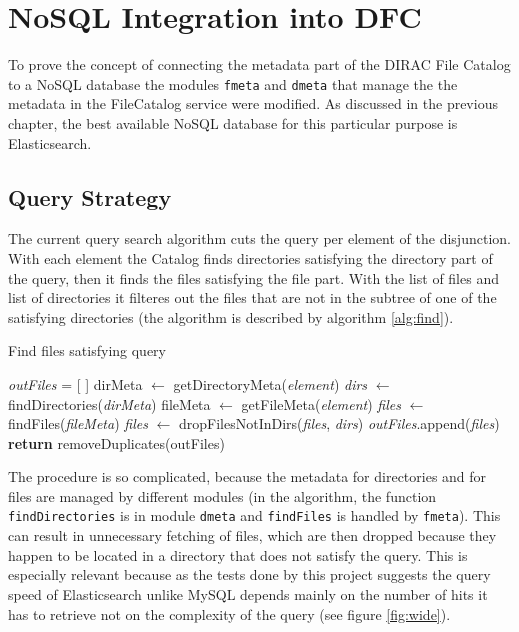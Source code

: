 \chapter{NoSQL Integration into DFC}
\label{chap:NoSQL}

To prove the concept of connecting the metadata part of the DIRAC File Catalog to a NoSQL database the 
modules \texttt{fmeta} and \texttt{dmeta} that manage the the metadata in the FileCatalog service were modified.
As discussed in the previous chapter, the best available NoSQL database for this particular purpose is 
Elasticsearch. 

\section{Query Strategy}
The current query search algorithm cuts the query per element of the disjunction. With each element the Catalog
finds directories satisfying the directory part of the query, then it finds the files satisfying the file part. 
With the list of files and list of directories it filteres out the files that are not in the subtree of one of the
satisfying directories (the algorithm is described by algorithm \ref{alg:find}).

\begin{algorithm}[h]
\caption{Find files satisfying query}
\label{alg:find}
\begin{algorithmic}[1]
	\State \textit{outFiles} = [  ]
		\State dirMeta $\leftarrow$ getDirectoryMeta(\textit{element})
		\State \textit{dirs} $\leftarrow$ findDirectories(\textit{dirMeta}) 
		\State fileMeta $\leftarrow$ getFileMeta(\textit{element})
		\State \textit{files} $\leftarrow$ findFiles(\textit{fileMeta})
		\State \textit{files} $\leftarrow$ dropFilesNotInDirs(\textit{files}, \textit{dirs})
		\State \textit{outFiles}.append(\textit{files})
	\EndFor
	\State \textbf{return} removeDuplicates(outFiles)
\EndFunction
\end{algorithmic}
\end{algorithm}

The procedure is so complicated, because the metadata for directories and for files are managed by different 
modules (in the algorithm, the function \texttt{findDirectories} is in module \texttt{dmeta} and \texttt{findFiles} 
is handled by \texttt{fmeta}). This can result in unnecessary fetching of files, which are then dropped because
they happen to be located in a directory that does not satisfy the query. This is especially relevant because as
the tests done by this project suggests the query speed of Elasticsearch unlike MySQL depends mainly on the
number of hits it has to retrieve %
not on the complexity of the query (see figure \ref{fig:wide}). 

